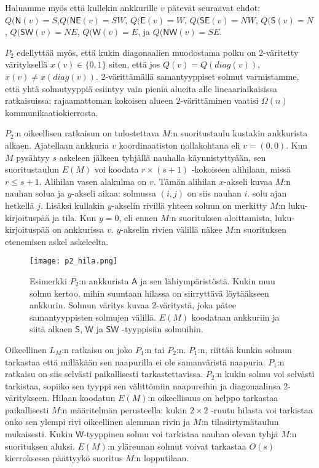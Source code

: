 \documentclass[12pt,finnish]{tktltiki2}
\theoremstyle{definition}
\theoremstyle{remark}
\begin{document}
Haluamme myös että kullekin ankkurille $v$ pätevät seuraavat ehdot: $Q(\mathsf{N}(v) = S$,$Q(\mathsf{NE}(v) = SW$, $Q(\mathsf{E}(v) = W$, $Q(\mathsf{SE}(v) = NW$, $Q(\mathsf{S}(v) = N$, $Q(\mathsf{SW}(v) = NE$, $Q(\mathsf{W}(v) = E$, ja $Q(\mathsf{NW}(v) = SE$.

$P_2$ edellyttää myös, että kukin diagonaalien muodostama polku on 2-väritetty värityksellä $x(v) \in \{0, 1\}$ siten, että jos $Q(v) = Q(diag(v))$, $x(v) \neq x(diag(v))$. 2-värittämällä samantyyppiset solmut varmistamme, että yhtä solmutyyppiä esiintyy vain pieniä alueita alle lineaariaikaisissa ratkaisuissa: rajaamattoman kokoisen alueen 2-värittäminen vaatisi $\Omega(n)$ kommunikaatiokierrosta.

$P_2$:n oikeellisen ratkaisun on tulostettava $M$:n suoritustaulu kustakin ankkurista alkaen. Ajatellaan ankkuria $v$ koordinaatiston nollakohtana eli $v = (0, 0)$. Kun $M$ pysähtyy $s$ askeleen jälkeen tyhjällä nauhalla käynnistyttyään, sen suoritustaulun $E(M)$ voi koodata $r \times (s+1)$ -kokoiseen alihilaan, missä $r \leq s + 1$. Alihilan vasen alakulma on $v$. Tämän alihilan $x$-akseli kuvaa $M$:n nauhan solua ja $y$-akseli aikaa: solmussa $(i, j)$ on siis nauhan $i.$ solu ajan hetkellä $j$. Lisäksi kullakin $y$-akselin rivillä yhteen soluun on merkitty $M$:n luku-kirjoituspää ja tila. Kun $y = 0$, eli ennen $M$:n suorituksen aloittamista, luku-kirjoituspää on ankkurissa $v$. $y$-akselin rivien välillä näkee $M$:n suorituksen etenemisen askel askeleelta.
\begin{figure}
  \centering
  \texttt{[image: p2\_hila.png]}
  \caption{Esimerkki $P_2$:n ankkurista $\mathsf{A}$ ja sen lähiympäristöstä. Kukin muu solmu kertoo, mihin suuntaan hilassa on siirryttävä löytääkseen ankkurin. Solmun väritys kuvaa 2-väritystä, joka pätee samantyyppisten solmujen välillä. $E(M)$ koodataan ankkuriin ja siitä alkaen $\mathsf{S}$, $\mathsf{W}$ ja $\mathsf{SW}$ -tyyppisiin solmuihin.}
\end{figure}

Oikeellinen $L_M$:n ratkaisu on joko $P_1$:n tai $P_2$:n. $P_1$:n, riittää kunkin solmun tarkastaa että milläkään sen naapurilla ei ole samanväristä naapuria. $P_1$:n ratkaisu on siis selvästi paikallisesti tarkastettavissa. $P_2$:n kukin solmu voi selvästi tarkistaa, sopiiko sen tyyppi sen välittömiin naapureihin ja diagonaalinsa 2-väritykseen. Hilaan koodatun $E(M)$:n oikeellisuus on helppo tarkastaa paikallisesti $M$:n määritelmän perusteella: kukin $2 \times 2$ -ruutu hilasta voi tarkistaa onko sen ylempi rivi oikeellinen alemman rivin ja $M$:n tilasiirtymätaulun mukaisesti. Kukin $\mathsf{W}$-tyyppinen solmu voi tarkistaa nauhan olevan tyhjä $M$:n suorituksen aluksi. $E(M)$:n yläreunan solmut voivat tarkastaa $O(s)$ kierroksessa päättyykö suoritus $M$:n lopputilaan.
\end{document}
